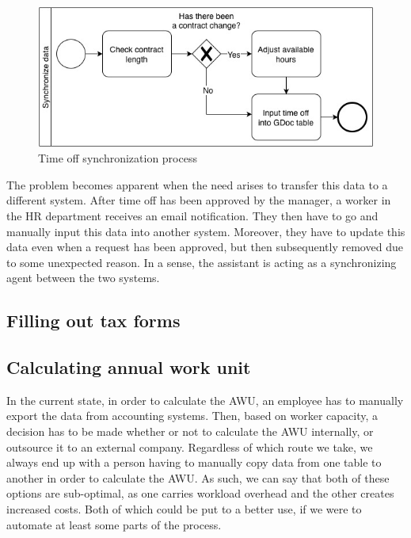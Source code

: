 \documentclass[12pt,oneside]{fithesis2}
\begin{document}
\begin{figure}[H]
    \centering
    \includegraphics[width=\textwidth]{images/sync_vacation_to_gdoc.jpg}
    \caption{Time off synchronization process}
    \label{fig:sync_vacation_to_gdoc}
\end{figure}
\newpage

The problem becomes apparent when the need arises to transfer this data to a different system. After time off has been approved by the manager, a worker in the HR department receives an email notification. They then have to go and manually input this data into another system. Moreover, they have to update this data even when a request has been approved, but then subsequently removed due to some unexpected reason. In a sense, the assistant is acting as a synchronizing agent between the two systems.

\subsection{Filling out tax forms}
\subsection{Calculating annual work unit}
In the current state, in order to calculate the AWU, an employee has to manually export the data from accounting systems. Then, based on worker capacity, a decision has to be made whether or not to calculate the AWU internally, or outsource it to an external company. Regardless of which route we take, we always end up with a person having to manually copy data from one table to another in order to calculate the AWU. As such, we can say that both of these options are sub-optimal, as one carries workload overhead and the other creates increased costs. Both of which could be put to a better use, if we were to automate at least some parts of the process.
\end{document}
